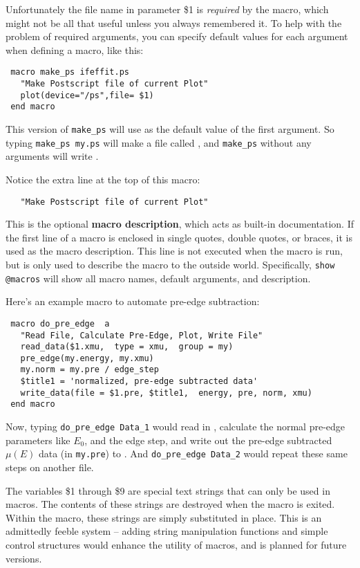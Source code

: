Unfortunately the file name in parameter \$1 is {\emph{required}} by the
macro, which might not be all that useful unless you always remembered it.
To help with the problem of required arguments, you can specify default
values for each argument when defining a macro, like this:
\begin{verbatim}
 macro make_ps ifeffit.ps
   "Make Postscript file of current Plot"
   plot(device="/ps",file= $1)
 end macro
\end{verbatim} %
\noindent
This version of {\tt{make\_ps}} will use {} as the default
value of the first argument.  So typing {\texttt{make\_ps my.ps}} will make
a file called {}, and {\texttt{make\_ps}} without any arguments
will write {}.  

Notice the extra line at the top of this macro: 
\begin{verbatim}
   "Make Postscript file of current Plot"
\end{verbatim} %
\noindent
This is the optional {\bf{macro description}}, which acts as  built-in
documentation.  If the first line of a macro is enclosed in single quotes,
double quotes, or braces, it is used as the macro description.  This line
is not executed when the macro is run, but is only used to describe the
macro to the outside world.  Specifically, {\tt{show @macros}} will show
all macro names, default arguments, and description.

Here's an example macro to automate pre-edge subtraction:
\begin{verbatim}
 macro do_pre_edge  a
   "Read File, Calculate Pre-Edge, Plot, Write File"
   read_data($1.xmu,  type = xmu,  group = my)
   pre_edge(my.energy, my.xmu)
   my.norm = my.pre / edge_step
   $title1 = 'normalized, pre-edge subtracted data' 
   write_data(file = $1.pre, $title1,  energy, pre, norm, xmu)
 end macro
\end{verbatim}  %
\noindent 
Now, typing {\texttt{do\_pre\_edge Data\_1}} would read in
{}, calculate the normal pre-edge parameters like
$E_0$, and the edge step, and write out the pre-edge subtracted
$\mu(E)$ data (in {\texttt{my.pre}}) to {}.  And
{\texttt{do\_pre\_edge Data\_2}} would repeat these same steps on another
file.

The variables \$1 through \$9 are special text strings that can only
be used in macros.  The contents of these strings are destroyed when
the macro is exited.  Within the macro, these strings are simply
substituted in place.  This is an admittedly feeble system -- adding
string manipulation functions and simple control structures would
enhance the utility of macros, and is planned for future versions.

